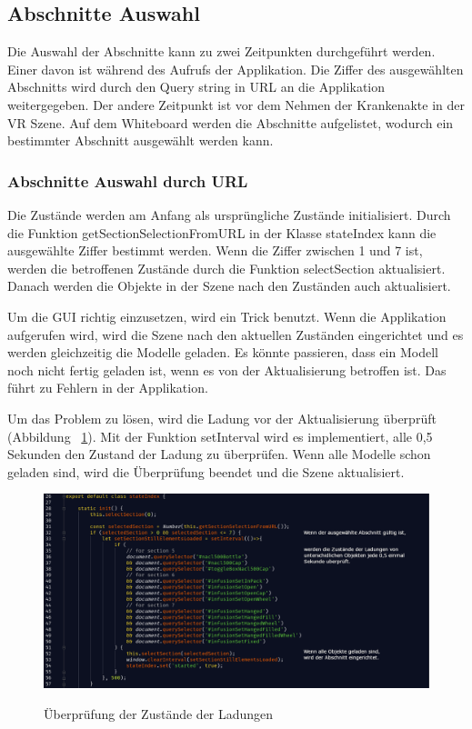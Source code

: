  \subsection{Abschnitte Auswahl}
 Die Auswahl der Abschnitte kann zu zwei Zeitpunkten durchgeführt werden. Einer davon ist während des Aufrufs der Applikation. Die Ziffer des ausgewählten Abschnitts wird durch den Query string in URL an die Applikation weitergegeben. Der andere Zeitpunkt ist vor dem Nehmen der Krankenakte in der VR Szene. Auf dem Whiteboard werden die Abschnitte aufgelistet, wodurch ein bestimmter Abschnitt ausgewählt werden kann.
 
  \subsubsection{Abschnitte Auswahl durch URL}
  Die Zustände werden am Anfang als ursprüngliche Zustände initialisiert. Durch die Funktion {\selectfont getSectionSelectionFromURL} in der Klasse {\selectfont stateIndex} kann die ausgewählte Ziffer bestimmt werden. Wenn die Ziffer zwischen 1 und 7 ist, werden die betroffenen Zustände durch die Funktion {\selectfont selectSection} aktualisiert. Danach werden die Objekte in der Szene nach den Zuständen auch aktualisiert.
  
  Um die GUI richtig einzusetzen, wird ein Trick benutzt. Wenn die Applikation aufgerufen wird, wird die Szene nach den aktuellen Zuständen eingerichtet und es werden gleichzeitig die Modelle geladen. Es könnte passieren, dass ein Modell noch nicht fertig geladen ist, wenn es von der Aktualisierung betroffen ist. Das führt zu Fehlern in der Applikation.
  
  Um das Problem zu lösen, wird die Ladung vor der Aktualisierung überprüft (Abbildung ~\ref{fig:checkLadung}). Mit der Funktion {\selectfont setInterval} wird es implementiert, alle 0,5 Sekunden den Zustand der Ladung zu überprüfen. Wenn alle Modelle schon geladen sind, wird die Überprüfung beendet und die Szene aktualisiert.
  
\begin{figure}[ht]
\vspace*{1.2em}
\centering
\caption[Überprüfung der Zustände der Ladungen]{Überprüfung der Zustände der Ladungen}
\includegraphics[width=\textwidth]{images/checkLadung.png}
\label{fig:checkLadung} 
\end{figure}
  
